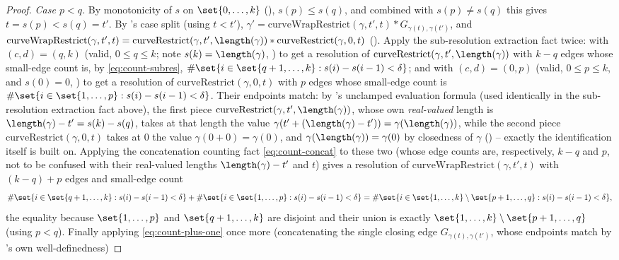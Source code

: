 \begin{proof}
  \emph{Case $p<q$.} By monotonicity of $s$ on $\set{0,\dots,k}$ (),
  $s(p) \le s(q)$, and combined with $s(p)\ne s(q)$ this gives $t=s(p)<s(q)=t'$. By
  's case split (using $t<t'$),
  $\gamma' = \mathrm{curveWrapRestrict}(\gamma,t',t) * G_{\gamma(t),\gamma(t')}$, and
  $\mathrm{curveWrapRestrict}(\gamma,t',t) = \mathrm{curveRestrict}(\gamma,t',\length(\gamma)) *
  \mathrm{curveRestrict}(\gamma,0,t)$ (). Apply the sub-resolution
  extraction fact twice: with $(c,d)=(q,k)$ (valid, $0\le q\le k$; note $s(k)=\length(\gamma)$,
  ) to get a resolution of $\mathrm{curveRestrict}(\gamma,t',
  \length(\gamma))$ with $k-q$ edges whose small-edge count is, by \eqref{eq:count-subres},
  $\#\set{i \in \set{q+1,\dots,k} : s(i)-s(i-1)<\delta}$; and with $(c,d)=(0,p)$ (valid, $0\le
  p\le k$, and $s(0)=0$, ) to get a resolution of
  $\mathrm{curveRestrict}(\gamma,0,t)$ with $p$ edges whose small-edge count is
  $\#\set{i \in \set{1,\dots,p} : s(i)-s(i-1)<\delta}$. Their endpoints match: by
  's unclamped evaluation formula (used identically in the sub-resolution
  extraction fact above), the first piece $\mathrm{curveRestrict}(\gamma,t',\length(\gamma))$,
  whose own \emph{real-valued} length is $\length(\gamma)-t' = s(k)-s(q)$, takes at that length the
  value $\gamma(t'+(\length(\gamma)-t')) = \gamma(\length(\gamma))$, while the second piece
  $\mathrm{curveRestrict}(\gamma,0,t)$ takes at $0$ the value $\gamma(0+0)=\gamma(0)$, and
  $\gamma(\length(\gamma))=\gamma(0)$ by closedness of $\gamma$ () -- exactly
  the identification  itself is built on. Applying the concatenation
  counting fact \eqref{eq:count-concat} to these two (whose edge counts are, respectively, $k-q$
  and $p$, not to be confused with their real-valued lengths $\length(\gamma)-t'$ and $t$) gives a
  resolution of $\mathrm{curveWrapRestrict}(\gamma,t',t)$ with $(k-q)+p$ edges and small-edge count
  \[
    \#\set{i \in \set{q+1,\dots,k} : s(i)-s(i-1)<\delta}
    + \#\set{i \in \set{1,\dots,p} : s(i)-s(i-1)<\delta}
    = \#\set{i \in \set{1,\dots,k}\setminus\set{p+1,\dots,q} : s(i)-s(i-1)<\delta}
    ,
  \]
  the equality because $\set{1,\dots,p}$ and $\set{q+1,\dots,k}$ are disjoint and their union is
  exactly $\set{1,\dots,k}\setminus\set{p+1,\dots,q}$ (using $p<q$). Finally applying
  \eqref{eq:count-plus-one} once more (concatenating the single closing edge
  $G_{\gamma(t),\gamma(t')}$, whose endpoints match by 's own well-definedness)

\end{proof}
